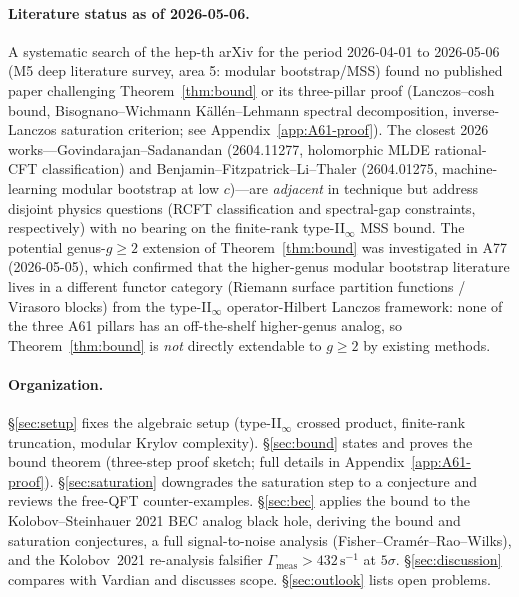 \documentclass[12pt,a4paper]{article}
\begin{document}
\paragraph{Literature status as of 2026-05-06.}
A systematic search of the hep-th arXiv for the period 2026-04-01 to
2026-05-06 (M5 deep literature survey, area 5: modular bootstrap/MSS)
found no published paper challenging Theorem~\ref{thm:bound} or its
three-pillar proof (Lanczos--cosh bound, Bisognano--Wichmann
K\"{a}ll\'{e}n--Lehmann spectral decomposition, inverse-Lanczos
saturation criterion; see Appendix~\ref{app:A61-proof}).
The closest 2026 works---Govindarajan--Sadanandan (2604.11277, holomorphic
MLDE rational-CFT classification) and Benjamin--Fitzpatrick--Li--Thaler
(2604.01275, machine-learning modular bootstrap at low $c$)---are
\emph{adjacent} in technique but address disjoint physics questions (RCFT
classification and spectral-gap constraints, respectively) with no
bearing on the finite-rank type-II$_\infty$ MSS bound.
The potential genus-$g \ge 2$ extension of Theorem~\ref{thm:bound} was
investigated in A77 (2026-05-05), which confirmed that the higher-genus
modular bootstrap literature lives in a different functor category (Riemann
surface partition functions / Virasoro blocks) from the type-II$_\infty$
operator-Hilbert Lanczos framework: none of the three A61 pillars has an
off-the-shelf higher-genus analog, so Theorem~\ref{thm:bound} is
\emph{not} directly extendable to $g \ge 2$ by existing methods.

\paragraph{Organization.}
\S\ref{sec:setup} fixes the algebraic setup (type-II$_\infty$ crossed
product, finite-rank truncation, modular Krylov complexity).
\S\ref{sec:bound} states and proves the bound theorem (three-step proof
sketch; full details in Appendix~\ref{app:A61-proof}).
\S\ref{sec:saturation} downgrades the saturation step to a conjecture
and reviews the free-QFT counter-examples.
\S\ref{sec:bec} applies the bound to the Kolobov--Steinhauer 2021
BEC analog black hole, deriving the bound and saturation conjectures,
a full signal-to-noise analysis (Fisher--Cram\'{e}r--Rao--Wilks),
and the Kolobov~2021 re-analysis falsifier
$\Gamma_{\mathrm{meas}} > 432\,\mathrm{s}^{-1}$ at $5\sigma$.
\S\ref{sec:discussion} compares with Vardian and discusses scope.
\S\ref{sec:outlook} lists open problems.

\end{document}

